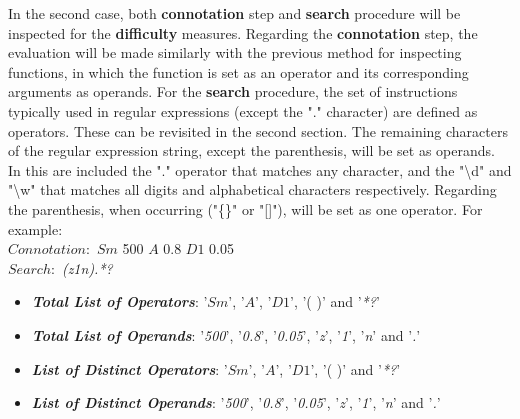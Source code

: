 In the second case, both \textbf{connotation} step and \textbf{search} procedure will be inspected for the \textbf{difficulty} measures. Regarding the \textbf{connotation} step, the evaluation will be made similarly with the previous method for inspecting functions, in which the function is set as an operator and its corresponding arguments as operands. For the \textbf{search} procedure, the set of instructions typically used in regular expressions (except the "." character) are defined as operators\citep{regex}. These can be revisited in the second section. The remaining characters of the regular expression string, except the parenthesis, will be set as operands. In this are included the "." operator that matches any character, and the "\textbackslash d" and "\textbackslash w" that matches all digits and alphabetical characters respectively. Regarding the parenthesis, when occurring ("\{\}" or "[]"), will be set as one operator. For example:\\

{\centering
\textbf{$Connotation: $} $Sm$ 500  $A$ 0.8 $D1$ 0.05\\
\textbf{$Search: $} \textit{(z1n).*?}\\ }

\begin{itemize}
\item \textit{\textbf{Total List of Operators}}: '$Sm$', '$A$', '$D1$', '( )' and '\textit{*?}'
\item \textit{\textbf{Total List of Operands}}: '\textit{500}', '\textit{0.8}', '\textit{0.05}', '\textit{z}', '\textit{1}', '\textit{n}' and '\textit{.}'
\item \textit{\textbf{List of Distinct Operators}}: '$Sm$', '$A$', '$D1$', '( )' and '\textit{*?}'
\item \textit{\textbf{List of Distinct Operands}}: '\textit{500}', '\textit{0.8}', '\textit{0.05}', '\textit{z}', '\textit{1}', '\textit{n}' and '\textit{.}'
\end{itemize}


